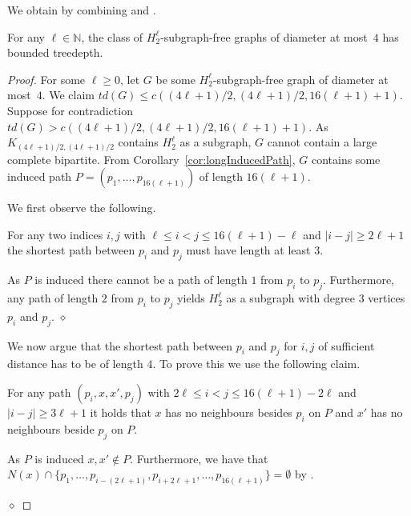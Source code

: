 \documentclass[runningheads,envcountsame]{llncs}
\renewcommand*{\theHmclaim}{\theHtheorem.\arabic{mclaim}}
\newcommand{\Hgraph}[1]{H_{#1}}
\newenvironment{claimproof}
{\noindent {\em Proof of Claim:} }
{\hfill $\diamond$ \smallskip}
\begin{document}
We obtain  by combining  and .


\begin{lemma}
\label{lem:H2}
    For any $\ell \in \mathbb{N}$, the class of $\Hgraph{2}^{\ell}$-subgraph-free graphs of diameter at most~$4$ has bounded treedepth.
\end{lemma}
\begin{proof}



    For some $\ell \geq 0$, let $G$ be some $\Hgraph{2}^{\ell}$-subgraph-free graph of diameter at most~$4$. We claim $td(G) \leq c((4\ell+1)/2, (4\ell+1)/2, 16(\ell+1)+1)$. Suppose for contradiction $td(G) > c((4\ell+1)/2, (4\ell+1)/2, 16(\ell+1)+1)$. As $K_{(4\ell+1)/2, (4\ell+1)/2}$ contains $\Hgraph{2}^{\ell}$ as a subgraph, $G$ cannot contain a large complete bipartite. From Corollary~\ref{cor:longInducedPath}, $G$ contains some induced path $P= (p_1, \ldots, p_{16(\ell+1)})$ of length $16(\ell+1)$.

    We first observe the following.
    \begin{mclaim}\label{claim:HGraph_distAtLeast3}
        For any two indices $i,j$ with $\ell \leq i < j \leq 16(\ell+1)-\ell$ and $|i-j| \geq 2\ell+1$ the shortest path between $p_{i}$ and $p_j$ must have length at least $3$.
    \end{mclaim}
    \begin{claimproof}
        As $P$ is induced there cannot be a path of length $1$ from $p_i$ to $p_j$. Furthermore, any path of length $2$ from $p_i$ to $p_j$  yields $\Hgraph{2}^{\ell}$ as a subgraph with degree 3 vertices $p_i$ and $p_j$. 
    \end{claimproof}

    We now argue that the shortest path between $p_i$ and $p_j$ for $i,j$ of sufficient distance has to be of length $4$. To prove this we use the following claim.
\begin{mclaim}\label{claim:HGraph_pathOfLength3}
    For any path $(p_i,x,x',p_j)$  with $2\ell \leq i < j \leq 16(\ell+1)-2\ell$ and $|i-j| \geq 3\ell+1$ it holds that $x$ has no neighbours besides $p_i$ on $P$ and $x'$ has no neighbours beside $p_j$ on $P$. 
\end{mclaim}
\begin{claimproof}
    As $P$ is induced $x, x' \notin P$. Furthermore,  we have that $N(x) \cap \{p_1,\dots, p_{i-(2\ell+1)}, p_{i+2\ell+1},\dots, p_{16(\ell+1)}\} = \emptyset$ by .


\end{claimproof}
\end{proof}
\end{document}
